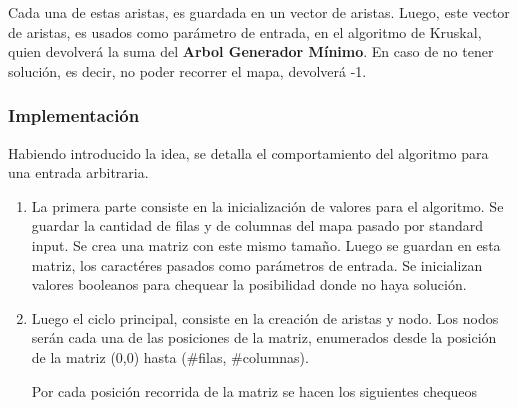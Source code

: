     Cada una de estas aristas, es guardada en un vector de aristas.
    Luego, este vector de aristas, es usados como parámetro de entrada, en el algoritmo de Kruskal, quien devolverá la suma del \textbf{Arbol Generador Mínimo}. En caso de no tener solución, es decir, no poder recorrer el mapa, devolverá -1.



	\subsubsection{Implementación}\label{ej2_imp}

	Habiendo introducido la idea, se detalla el comportamiento del algoritmo para
	una entrada arbitraria.


	\begin{enumerate}
		\item{
			La primera parte consiste en la inicialización de valores para el algoritmo. Se guardar la cantidad de filas y de columnas del mapa pasado por standard input. Se crea una matriz con este mismo tamaño. Luego se guardan en esta matriz, los caractéres pasados como parámetros de entrada. Se inicializan valores booleanos para chequear la posibilidad donde no haya solución.
		}

		\item{
			Luego el ciclo principal, consiste en la creación de aristas y nodo. Los nodos serán cada una de las posiciones de la matriz, enumerados desde la posición de la matriz (0,0) hasta (#filas, #columnas).

			Por cada posición recorrida de la matriz se hacen los siguientes chequeos

}
\end{enumerate}
